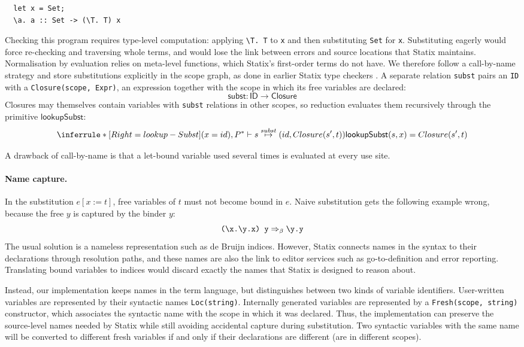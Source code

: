 \begin{lstlisting}
  let x = Set;
  \a. a :: Set -> (\T. T) x
\end{lstlisting}

\noindent Checking this program requires type-level computation: applying
\texttt{\textbackslash T. T} to \texttt{x} and then substituting
\texttt{Set} for \texttt{x}. Substituting eagerly would force re-checking and
traversing whole terms, and would lose the link between errors and source
locations that Statix maintains. Normalisation by evaluation
\autocite{abel2007oneuniverse} relies on meta-level functions, which Statix's
first-order terms do not have. We therefore follow a call-by-name strategy
\autocite{plotkin1975call} and store substitutions explicitly in the scope graph,
as done in earlier Statix type checkers
\autocite{van_antwerpen_scopes_2018, none_dependently_2023}. A separate relation
\texttt{subst} pairs an \texttt{ID} with a \texttt{Closure(scope, Expr)}, an
expression together with the scope in which its free variables are declared:
\[ \mathsf{subst} : \mathsf{ID} \rightarrow \mathsf{Closure} \]
Closures may themselves contain variables with \texttt{subst} relations in other
scopes, so reduction evaluates them recursively through the primitive
$\mathsf{lookupSubst}$:
\[
\inferrule*[Right=lookup-Subst]
{(x = id), P^* \vdash s \stackrel{subst}{\mapsto} (id, Closure(s', t))}{\mathsf{lookupSubst}(s, x) = Closure(s', t)}
\]

A drawback of call-by-name is that a let-bound variable used several times is
evaluated at every use site.

\paragraph{Name capture.} In the substitution
$e[x := t]$, free variables of $t$ must not become bound in $e$. Naive
substitution gets the following example wrong, because the free $y$ is captured
by the binder $y$:
\[
  \texttt{(\textbackslash x.\textbackslash y.x) y} \Rightarrow_{\beta} \texttt{\textbackslash y.y}
\]
The usual solution is a nameless representation such as de Bruijn indices.
However, Statix connects names in the syntax to their declarations through
resolution paths, and these names are also the link to editor services such as
go-to-definition and error reporting. Translating bound variables to indices
would discard exactly the names that Statix is designed to reason about.

Instead, our implementation keeps names in the term language, but distinguishes
between two kinds of variable identifiers. User-written variables are
represented by their syntactic names \texttt{Loc(string)}. Internally generated variables are represented by a \texttt{Fresh(scope, string)} constructor, which associates the syntactic name with the scope in which it was declared. Thus, the implementation can preserve the source-level names needed by Statix while still avoiding accidental capture during substitution. Two syntactic variables with the same name will be converted to different fresh variables if and only if their declarations are different (are in different scopes).

